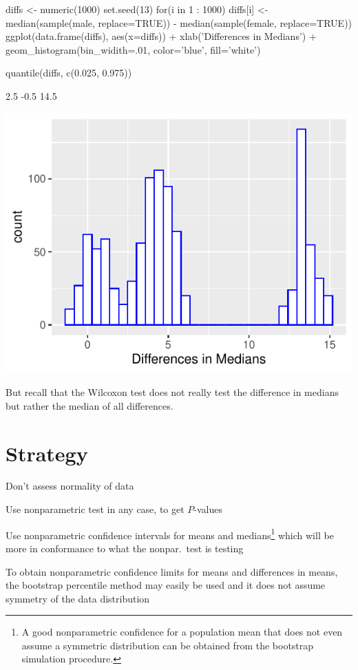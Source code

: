 \begin{Schunk}
\begin{Sinput}
diffs <- numeric(1000)
set.seed(13)
for(i in 1 : 1000) diffs[i] <-
  median(sample(male, replace=TRUE)) - median(sample(female, replace=TRUE))
ggplot(data.frame(diffs), aes(x=diffs)) + xlab('Differences in Medians') +
  geom_histogram(bin_widith=.01, color='blue', fill='white')
\end{Sinput}
\begin{Sinput}
quantile(diffs, c(0.025, 0.975))
\end{Sinput}
\begin{Soutput}
 2.5%
 -0.5  14.5 
\end{Soutput}


\centerline{\includegraphics[width=\maxwidth]{nonpar-diffmedboot-1} }

\end{Schunk}
But recall that the Wilcoxon test does not really test the difference
in medians but rather the median of all differences.

\section{Strategy}
\bi
\item Don't assess normality of data
\item Use nonparametric test in any case, to get $P$-values
\item Use nonparametric confidence intervals for means and
  medians\footnote{A good nonparametric confidence for a population
    mean that does not even assume a symmetric distribution can be
    obtained from the bootstrap simulation procedure.}
  which will be more in conformance to what the nonpar.\ test is
  testing
\item To obtain nonparametric confidence limits for means and
  differences in means, the bootstrap percentile method may easily be
  used and it does not assume symmetry of the data distribution
\ei

